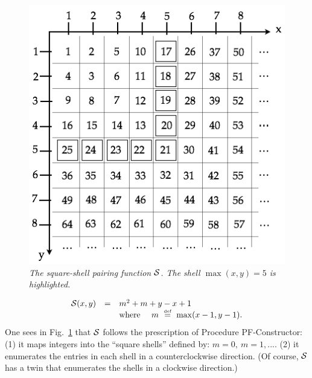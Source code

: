 \begin{figure}[htb]
\begin{center}
   \includegraphics[scale=0.4]{FiguresArithmetic/PairingSquareShell}
\end{center}
\caption{{\it The square-shell pairing function $\mbox{$\cal S$}$.  The shell
    $\max(x,y) = 5$ is highlighted.}
\label{fig:pairingSquareShell}}
\end{figure}
\begin{equation}
\label{e.square}
\begin{array}{ccl}
\mbox{$\cal S$}(x, y) & = & m^2 + m + y-x+1 \\
 & & \mbox{where } \ \ \  m \ \stackrel{\mbox{{\tiny def}}}{=} \ \max(x-1,y-1).
\end{array}
\end{equation}
One sees in Fig.~\ref{fig:pairingSquareShell} that $\mbox{$\cal S$}$ follows the
prescription of Procedure PF-Constructor: (1) it maps integers into
the ``square shells'' defined by: $m = 0, \ m = 1, ...$.  (2) it
enumerates the entries in each shell in a counterclockwise direction.
(Of course, $\mbox{$\cal S$}$ has a twin that enumerates the shells in a clockwise
direction.)
\bigskip

